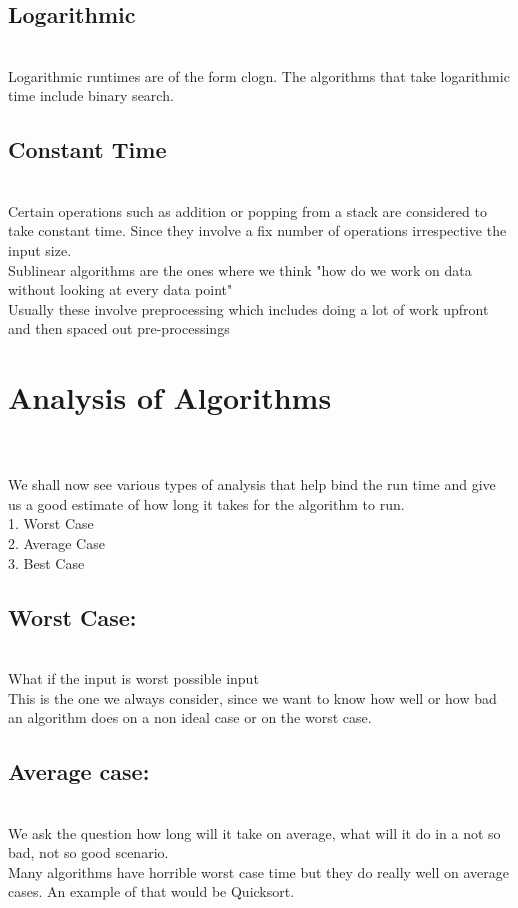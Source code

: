 \subsection{Logarithmic}
\\ Logarithmic runtimes are of the form clogn. The algorithms that take logarithmic time include binary search.
\subsection{ Constant Time}
\\ Certain operations such as addition or popping from a stack are considered to take constant time. Since they involve a fix number of operations irrespective the input size. 
\\Sublinear algorithms are the ones where we think "how do we work on data without looking at every data point"
\\Usually these involve preprocessing which includes doing a lot of work upfront and then spaced out pre-processings
\section{Analysis of Algorithms}
\\
\\ We shall now see various types of analysis that help bind the run time and give us a good estimate of how long it takes for the algorithm to run.
\\	1. Worst Case
\\	2. Average Case
\\	3. Best Case

\subsection{Worst Case:}
\\What if the input is worst possible input
\\ This is the one we always consider, since we want to know how well or how bad an algorithm does on a non ideal case or on the worst case.
\\
\subsection{Average case:}
\\We ask the question how long will it take on average, what will it do in a not so bad, not so good scenario.
\\Many algorithms have horrible worst case time but they do really well on average cases. An example of that would be Quicksort.

